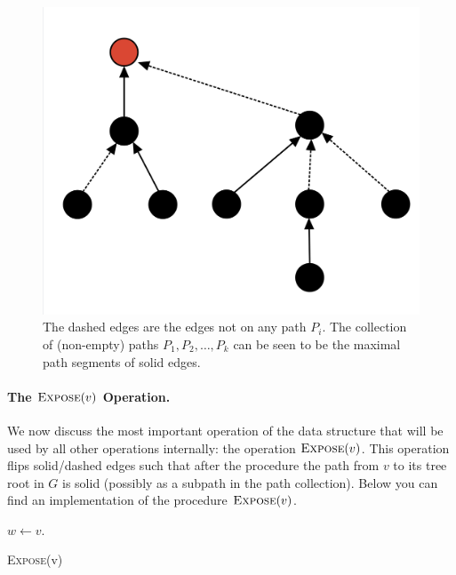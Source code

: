 \begin{figure}[!ht]
    \centering
    \includegraphics[scale=0.20]{./fig/HeavyLightDecomposition_lectureDynamicTree.jpeg}
    \caption{The dashed edges are the edges not on any path $P_i$. The collection of (non-empty) paths $P_1, P_2, \dots, P_k$ can be seen to be the maximal path segments of solid edges.}
\end{figure}

\paragraph{The $\textsc{Expose}(v)$ Operation.} We now discuss the most important operation of the data structure that will be used by all other operations internally: the operation $\textsc{Expose}(v)$. This operation flips solid/dashed edges such that after the procedure the path from $v$ to its tree root in $G$ is solid (possibly as a subpath in the path collection). Below you can find an implementation of the procedure $\textsc{Expose}(v)$. 

\begin{algorithm}
  \SetAlgoLined
  $w \gets v$.\\
  \caption{\textsc{Expose}(v)}
\end{algorithm}

